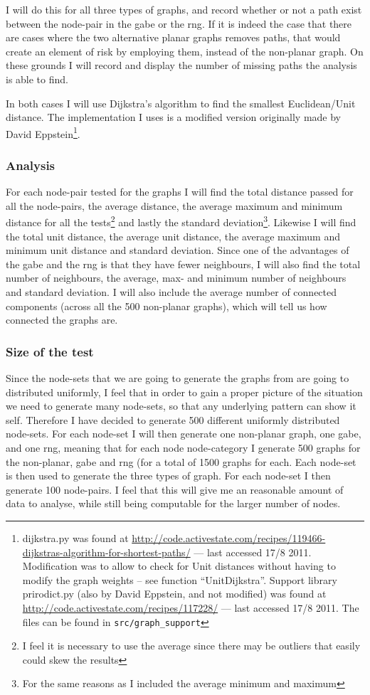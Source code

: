 I will do this for all three types of graphs, and record whether or not a path exist between the node-pair in the \ac{gabe} or the \ac{rng}. If it is indeed the case that there are cases where the two alternative planar graphs removes paths, that would create an element of risk by employing them, instead of the non-planar graph. On these grounds I will record and display the number of missing paths the analysis is able to find.

In both cases I will use Dijkstra's algorithm to find the smallest Euclidean/Unit distance. The implementation I uses is a modified version originally made by David Eppstein\footnote{dijkstra.py was found at \url{http://code.activestate.com/recipes/119466-dijkstras-algorithm-for-shortest-paths/} --- last accessed 17/8 2011. Modification was to allow to check for Unit distances without having to modify the graph weights -- see function ``UnitDijkstra''. Support library prirodict.py (also by David Eppstein, and not modified) was found at \url{http://code.activestate.com/recipes/117228/} --- last accessed 17/8 2011. The files can be found in \texttt{src/graph\_support}}.

\subsubsection{Analysis}
For each node-pair tested for the graphs I will find the total distance passed for all the node-pairs, the average distance, the average maximum and minimum distance for all the tests\footnote{I feel it is necessary to use the average since there may be outliers that easily could skew the results} and lastly the standard deviation\footnote{For the same reasons as I included the average minimum and maximum}. Likewise I will find the total unit distance, the average unit distance, the average maximum and minimum unit distance and standard deviation. Since one of the advantages of the \ac{gabe} and the \ac{rng} is that they have fewer neighbours, I will also find the total number of neighbours, the average, max- and minimum number of neighbours and standard deviation. I will also include the average number of connected components (across all the 500 non-planar graphs), which will tell us how connected the graphs are.

\subsubsection{Size of the test}
Since the node-sets that we are going to generate the graphs from are going to distributed uniformly, I feel that in order to gain a proper picture of the situation we need to generate many node-sets, so that any underlying pattern can show it self. Therefore I have decided to generate 500 different uniformly distributed node-sets. For each node-set I will then generate one non-planar graph, one \ac{gabe}, and one \ac{rng}, meaning that for each node node-category I  generate 500 graphs for the non-planar, \ac{gabe} and \ac{rng} (for a total of 1500 graphs for each. Each node-set is then used to generate the three types of graph. For each node-set I then generate 100 node-pairs. I feel that this will give me an reasonable amount of data to analyse, while still being computable for the larger number of nodes.


